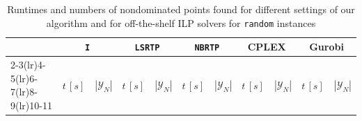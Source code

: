 \documentclass{article}
\begin{document}
\begingroup\fontsize{9}{10}\selectfont
\begin{longtable}{lrrrrrrrrrr}
\caption{\label{tab:off_the_shelf_rand}Runtimes and numbers of nondominated points found for different settings of our algorithm and for off-the-shelf ILP solvers for \texttt{random} instances}\\
\toprule
  & \multicolumn{2}{c}{\texttt{I}} & \multicolumn{2}{c}{\texttt{LSRTP}} & \multicolumn{2}{c}{\texttt{NBRTP}}  & \multicolumn{2}{c}{CPLEX} & \multicolumn{2}{c}{Gurobi} \\%
  \cmidrule(lr){2-3}\cmidrule(lr){4-5}\cmidrule(lr){6-7}\cmidrule(lr){8-9}\cmidrule(lr){10-11}
\multicolumn{1}{c}{instance} &\multicolumn{1}{c}{$t \,[s]$} & \multicolumn{1}{c}{$|\mathcal{Y}_N|$} &\multicolumn{1}{c}{$t \,[s]$} & \multicolumn{1}{c}{$|\mathcal{Y}_N|$} & \multicolumn{1}{c}{$t \,[s]$} & \multicolumn{1}{c}{$|\mathcal{Y}_N|$} & \multicolumn{1}{c}{$t \,[s]$} & \multicolumn{1}{c}{$|\mathcal{Y}_N|$} & \multicolumn{1}{c}{$t \,[s]$} & \multicolumn{1}{c}{$|\mathcal{Y}_N|$} \\


\end{longtable}
\end{document}
